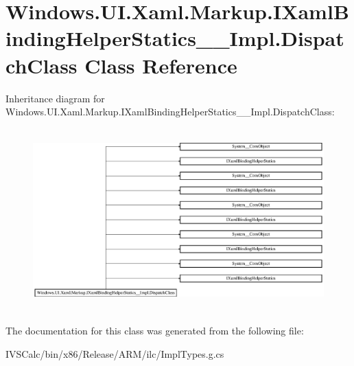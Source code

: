 \hypertarget{class_windows_1_1_u_i_1_1_xaml_1_1_markup_1_1_i_xaml_binding_helper_statics_____impl_1_1_dispatch_class}{}\section{Windows.\+U\+I.\+Xaml.\+Markup.\+I\+Xaml\+Binding\+Helper\+Statics\+\_\+\+\_\+\+Impl.\+Dispatch\+Class Class Reference}
\label{class_windows_1_1_u_i_1_1_xaml_1_1_markup_1_1_i_xaml_binding_helper_statics_____impl_1_1_dispatch_class}
Inheritance diagram for Windows.\+U\+I.\+Xaml.\+Markup.\+I\+Xaml\+Binding\+Helper\+Statics\+\_\+\+\_\+\+Impl.\+Dispatch\+Class\+:\begin{figure}[H]
\begin{center}
\leavevmode
\includegraphics[height=7.064220cm]{class_windows_1_1_u_i_1_1_xaml_1_1_markup_1_1_i_xaml_binding_helper_statics_____impl_1_1_dispatch_class}
\end{center}
\end{figure}


The documentation for this class was generated from the following file\+:\begin{DoxyCompactItemize}
\item 
I\+V\+S\+Calc/bin/x86/\+Release/\+A\+R\+M/ilc/Impl\+Types.\+g.\+cs\end{DoxyCompactItemize}
